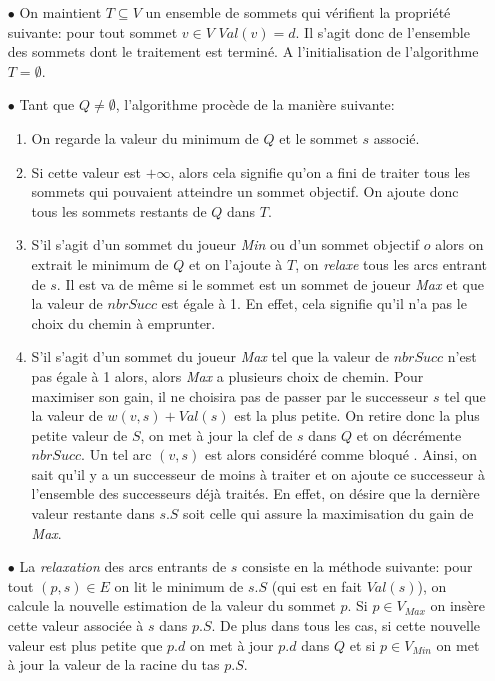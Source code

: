 \begin{enumerate}
	\item[$\bullet$] On maintient $T \subseteq V$ un ensemble de sommets qui vérifient la propriété suivante: pour tout sommet $v \in V$ $Val(v) = d$. Il s'agit donc de l'ensemble des sommets dont le traitement est terminé. A l'initialisation de l'algorithme $T = \emptyset$.
	
	\item[$\bullet$] Tant que $Q \neq \emptyset$, l'algorithme procède de la manière suivante: 
	\begin{enumerate}
		\item On regarde la valeur du minimum de $Q$ et le sommet $s$ associé.
		\item Si cette valeur est $+\infty$, alors cela signifie qu'on a fini de traiter tous les sommets qui pouvaient atteindre un sommet objectif. On ajoute donc tous les sommets restants de $Q$ dans $T$.
		\item S'il s'agit d'un sommet du joueur \textit{Min} ou d'un sommet objectif $o$ alors on extrait le minimum de $Q$ et on l'ajoute à $T$, on \textit{relaxe} tous les arcs entrant de $s$. Il est va de même si le sommet est un sommet de joueur \textit{Max} et que la valeur de $nbrSucc$ est égale à 1. En effet, cela signifie qu'il n'a pas le choix du chemin à emprunter.
		\item S'il s'agit d'un sommet du joueur \textit{Max} tel que la valeur de $nbrSucc$ n'est pas égale à 1 alors, alors \textit{Max} a plusieurs choix de chemin. Pour maximiser son gain, il ne choisira pas de passer par le successeur $s$ tel que la valeur de $w(v,s) + Val(s)$ est la plus petite. On retire donc la plus petite valeur de $S$, on met à jour la clef de $s$ dans $Q$ et on décrémente $nbrSucc$. Un tel arc $(v,s)$ est alors considéré comme \og bloqué \fg. Ainsi, on sait qu'il y a un successeur de moins à traiter et on ajoute ce successeur à l'ensemble des successeurs déjà traités. En effet, on désire que la dernière valeur restante dans $s.S$ soit celle qui assure la maximisation du gain de \textit{Max}.
	\end{enumerate}
	
	\item[$\bullet$] La \textit{relaxation} des arcs entrants de $s$ consiste en la méthode suivante: pour tout $(p,s)\in E$ on lit le minimum de $s.S$ (qui est en fait $Val(s)$), on calcule la nouvelle estimation de la valeur du sommet $p$. Si $p \in V_{Max}$ on insère cette valeur associée à $s$ dans $p.S$. De plus dans tous les cas, si cette nouvelle valeur est plus petite que $p.d$ on met à jour $p.d$ dans $Q$ et si $p \in V_{Min}$ on met à jour la valeur de la racine du tas $p.S$. 
	
\end{enumerate}

